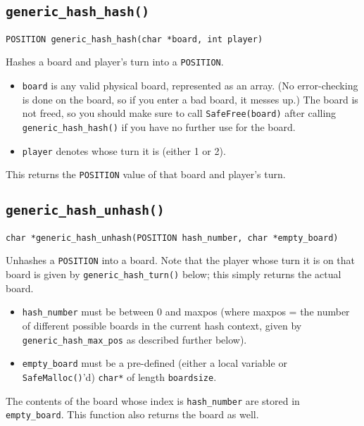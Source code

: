 \documentclass[11pt]{article}
\begin{document}
\subsection{\texttt{generic\_hash\_hash()}}

\texttt{POSITION generic\_hash\_hash(char *board, int player)}

Hashes a board and player's turn into a \texttt{POSITION}.

\begin{itemize}
\item \texttt{board} is any valid physical board, represented as an array.
(No error-checking is done on the board, so if you enter a bad board, it messes up.)
The board is not freed, so you should make sure to call \texttt{SafeFree(board)} after calling \texttt{generic\_hash\_hash()} if you have no further use for the board.

\item \texttt{player} denotes whose turn it is (either 1 or 2).
\end{itemize}

This returns the \texttt{POSITION} value of that board and player's turn.


\subsection{\texttt{generic\_hash\_unhash()}}

\texttt{char *generic\_hash\_unhash(POSITION hash\_number, char *empty\_board)}

Unhashes a \texttt{POSITION} into a board.
Note that the player whose turn it is on that board is given by \texttt{generic\_hash\_turn()} below;
this simply returns the actual board.

\begin{itemize}
\item \texttt{hash\_number} must be between 0 and maxpos (where maxpos = the number of different possible boards in the current hash context, given by \texttt{generic\_hash\_max\_pos} as described further below).

\item \texttt{empty\_board} must be a pre-defined (either a local variable or \texttt{SafeMalloc()}'d) \texttt{char*} of length \texttt{boardsize}.
\end{itemize}

The contents of the board whose index is \texttt{hash\_number} are stored in \texttt{empty\_board}.
This function also returns the board as well.
\end{document}
